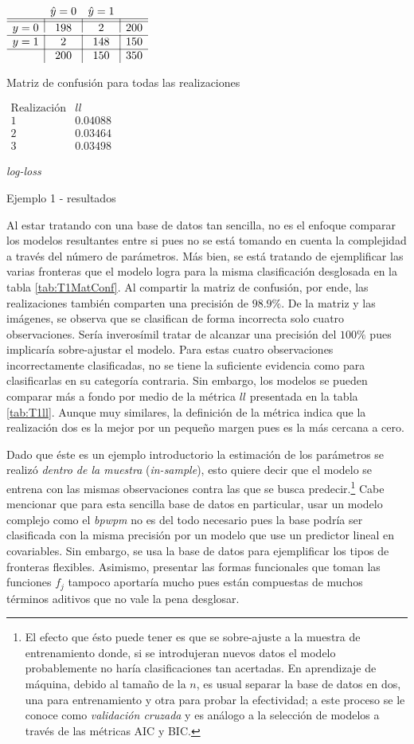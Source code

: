 \documentclass[../Main/Main.tex]{subfiles}
\begin{document}
\begin{table}[h]
\begin{subtable}[t]{0.45\textwidth}
	\centering
	$\begin{array}{l|c|c|l} ~ & \hat{y} = 0 & \hat{y} = 1 & ~ \\ \hline\hline y = 0 & 198 & 2 & 200 \\ \hline y = 1 & 2 & 148 & 150 \\ \hline ~ & 200 & 150 & 350 \end{array}$
	\caption{Matriz de confusión para todas las realizaciones}
	\label{tab:T1MatConf}
\end{subtable}
\hfill
\begin{subtable}[t]{0.45\textwidth}
	\centering
	$\begin{array}{c|c}
		\text{Realización} & ll \\ \hline\hline
		1 & 0.04088 \\
		2 & 0.03464 \\
		3 & 0.03498
	\end{array}$
	\caption{\textit{log-loss}}
	\label{tab:T1ll}
\end{subtable}
\caption{Ejemplo 1 - resultados}
\label{tab:T1Resultados}
\end{table}
Al estar tratando con una base de datos tan sencilla, no es el enfoque comparar los modelos resultantes entre si pues no se está tomando en cuenta la complejidad a través del número de parámetros. Más bien, se está tratando de ejemplificar las varias fronteras que el modelo logra para la misma clasificación desglosada en la tabla \ref{tab:T1MatConf}. Al compartir la matriz de confusión, por ende, las realizaciones también comparten una precisión de $98.9\%$. De la matriz y las imágenes, se observa que se clasifican de forma incorrecta solo cuatro observaciones. Sería inverosímil tratar de alcanzar una precisión del $100\%$ pues implicaría sobre-ajustar el modelo. Para estas cuatro observaciones incorrectamente clasificadas, no se tiene la suficiente evidencia como para clasificarlas en su categoría contraria. Sin embargo, los modelos se pueden comparar más a fondo por medio de la métrica $ll$ presentada en la tabla \ref{tab:T1ll}. Aunque muy similares, la definición de la métrica indica que la realización dos es la mejor por un pequeño margen pues es la más cercana a cero.

Dado que éste es un ejemplo introductorio la estimación de los parámetros se realizó \textit{dentro de la muestra} (\textit{in-sample}), esto quiere decir que el modelo se entrena con las mismas observaciones contra las que se busca predecir.\footnote{El efecto que ésto puede tener es que se sobre-ajuste a la muestra de entrenamiento donde, si se introdujeran nuevos datos el modelo probablemente no haría clasificaciones tan acertadas. En aprendizaje de máquina, debido al tamaño de la $n$, es usual separar la base de datos en dos, una para entrenamiento y otra para probar la efectividad; a este proceso se le conoce como \textit{validación cruzada} y es análogo a la selección de modelos a través de las métricas AIC y BIC.} Cabe mencionar que para esta sencilla base de datos en particular, usar un modelo complejo como el \textit{bpwpm} no es del todo necesario pues la base podría ser clasificada con la misma precisión por un modelo que use un predictor lineal en covariables. Sin embargo, se usa la base de datos para ejemplificar los tipos de fronteras flexibles. Asimismo, presentar las formas funcionales que toman las funciones $f_j$ tampoco aportaría mucho pues están compuestas de muchos términos aditivos que no vale la pena desglosar. 
\end{document}
